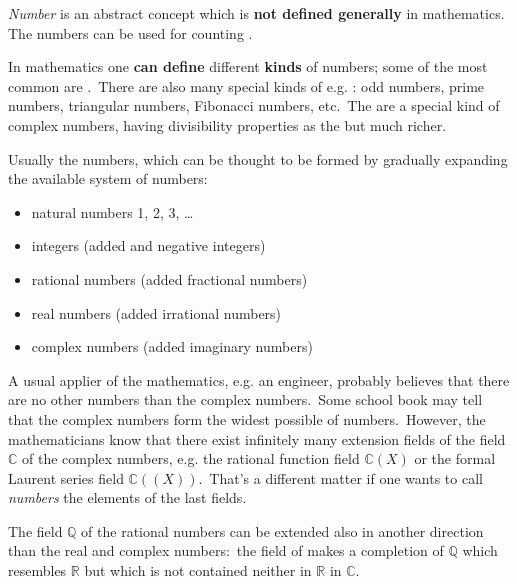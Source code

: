 \documentclass[12pt]{article}
\theoremstyle{definition}
\begin{document}
{\em Number} is an abstract concept which is 
\textbf{not defined generally} in mathematics.\, The numbers 
can be used for counting .

In mathematics one \textbf{can define} different 
\textbf{kinds} of numbers; some of the most common are 
.\, There are also many 
special kinds of e.g. : odd numbers, 
prime numbers, triangular numbers, Fibonacci numbers, etc.\, 
The  are 
a special kind of complex numbers, having 
 divisibility properties as the 
 but much richer.

Usually the  numbers, which can be thought to be formed by gradually expanding the available system of numbers:
\begin{itemize}
\item natural numbers 1, 2, 3, \ldots
\item integers (added  and negative integers)
\item rational numbers (added fractional numbers)
\item real numbers (added irrational numbers)
\item complex numbers (added imaginary numbers)
\end{itemize}
A usual applier of the mathematics, e.g. an engineer, probably 
believes that there are no other numbers than the complex 
numbers.\, Some school book may tell that the complex numbers 
form the widest possible  of numbers.\, However, the mathematicians know that there exist infinitely many extension fields of the field $\mathbb{C}$ of the complex numbers, e.g. the rational function field $\mathbb{C}(X)$ or the formal Laurent series field $\mathbb{C}((X))$.\, That's a different matter if one wants to call {\em numbers} the elements of the last fields.

The field $\mathbb{Q}$ of the rational numbers can be extended 
also in another direction than the real and complex numbers:\, 
the field of  makes a completion of $\mathbb{Q}$ which resembles $\mathbb{R}$ but which is not contained neither in $\mathbb{R}$  in $\mathbb{C}$.

\end{document}
